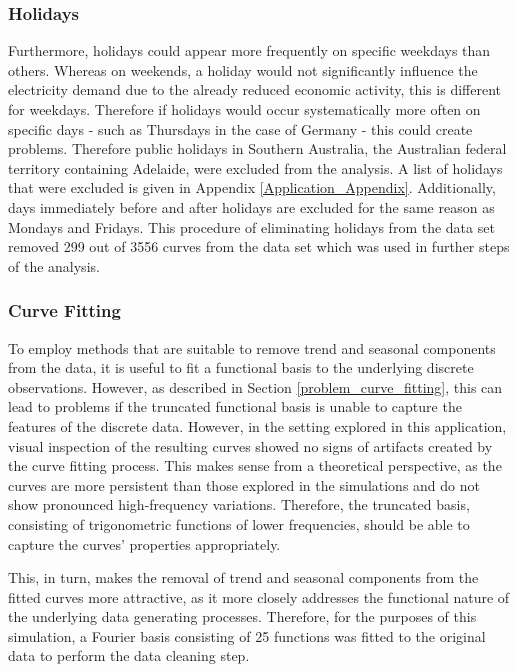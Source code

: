 \documentclass[12pt, a4paper]{article}
\theoremstyle{MAstyle} \newtheorem{assumption}{Assumption}[section]
\theoremstyle{MAstyle} \newtheorem{definition}{Definition}[section]
\theoremstyle{MAstyle} \newtheorem{theorem}{Theorem}[section]
\begin{document}
			\subsubsection{Holidays}
			Furthermore, holidays could appear more frequently on specific weekdays than others. Whereas on weekends, a holiday would not significantly influence the electricity demand due to the already reduced economic activity, this is different for weekdays. Therefore if holidays would occur systematically more often on specific days - such as Thursdays in the case of Germany - this could create problems. Therefore public holidays in Southern Australia, the Australian federal territory containing Adelaide, were excluded from the analysis. A list of holidays that were excluded is given in Appendix \ref{Application_Appendix}. Additionally, days immediately before and after holidays are excluded for the same reason as Mondays and Fridays. This procedure of eliminating holidays from the data set removed 299 out of 3556 curves from the data set which was used in further steps of the analysis. 
			
			\subsubsection{Curve Fitting}
			To employ methods that are suitable to remove trend and seasonal components from the data, it is useful to fit a functional basis to the underlying discrete observations. However, as described in Section \ref{problem_curve_fitting}, this can lead to problems if the truncated functional basis is unable to capture the features of the discrete data. However, in the setting explored in this application, visual inspection of the resulting curves showed no signs of artifacts created by the curve fitting process. This makes sense from a theoretical perspective, as the curves are more persistent than those explored in the simulations and do not show pronounced high-frequency variations. Therefore, the truncated basis, consisting of trigonometric functions of lower frequencies, should be able to capture the curves' properties appropriately.
			
			This, in turn, makes the removal of trend and seasonal components from the fitted curves more attractive, as it more closely addresses the functional nature of the underlying data generating processes. Therefore, for the purposes of this simulation, a Fourier basis consisting of 25 functions was fitted to the original data to perform the data cleaning step.
			
\end{document}
